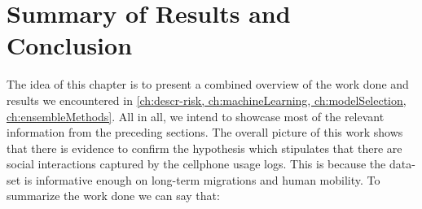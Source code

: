 
\chapter{Summary of Results and Conclusion}\label{ch:results_conclusion}




The idea of this chapter is to present a combined overview of the work done and results we encountered in \cref{ch:descr-risk, ch:machineLearning, ch:modelSelection, ch:ensembleMethods}.
All in all, we intend to showcase most of the relevant information from the preceding sections.
The overall picture of this work shows that there is evidence to confirm the hypothesis which stipulates that there are social interactions captured by the cellphone usage logs.
This is because the data-set is informative enough on long-term migrations and human mobility.
To summarize the work done we can say that:


